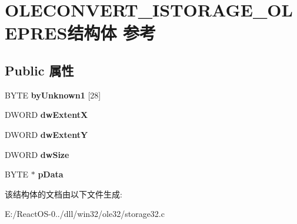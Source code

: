 \hypertarget{struct_o_l_e_c_o_n_v_e_r_t___i_s_t_o_r_a_g_e___o_l_e_p_r_e_s}{}\section{O\+L\+E\+C\+O\+N\+V\+E\+R\+T\+\_\+\+I\+S\+T\+O\+R\+A\+G\+E\+\_\+\+O\+L\+E\+P\+R\+E\+S结构体 参考}
\label{struct_o_l_e_c_o_n_v_e_r_t___i_s_t_o_r_a_g_e___o_l_e_p_r_e_s}
\subsection*{Public 属性}
\begin{DoxyCompactItemize}
\item 
\mbox{\label{struct_o_l_e_c_o_n_v_e_r_t___i_s_t_o_r_a_g_e___o_l_e_p_r_e_s_a837d3e5280df804a058091226aa56443}} 
B\+Y\+TE {\bfseries by\+Unknown1} \mbox{[}28\mbox{]}
\item 
\mbox{\label{struct_o_l_e_c_o_n_v_e_r_t___i_s_t_o_r_a_g_e___o_l_e_p_r_e_s_a820e91b803870cae967e7608cd7a14e7}} 
D\+W\+O\+RD {\bfseries dw\+ExtentX}
\item 
\mbox{\label{struct_o_l_e_c_o_n_v_e_r_t___i_s_t_o_r_a_g_e___o_l_e_p_r_e_s_a747fc868451fc960101d4c54cf720f7a}} 
D\+W\+O\+RD {\bfseries dw\+ExtentY}
\item 
\mbox{\label{struct_o_l_e_c_o_n_v_e_r_t___i_s_t_o_r_a_g_e___o_l_e_p_r_e_s_a329b877ed5d6635a00f264566180aebf}} 
D\+W\+O\+RD {\bfseries dw\+Size}
\item 
\mbox{\label{struct_o_l_e_c_o_n_v_e_r_t___i_s_t_o_r_a_g_e___o_l_e_p_r_e_s_a023f5d72c6797e92dc43154608062a9a}} 
B\+Y\+TE $\ast$ {\bfseries p\+Data}
\end{DoxyCompactItemize}


该结构体的文档由以下文件生成\+:\begin{DoxyCompactItemize}
\item 
E\+:/\+React\+O\+S-\/0../dll/win32/ole32/storage32.\+c\end{DoxyCompactItemize}
